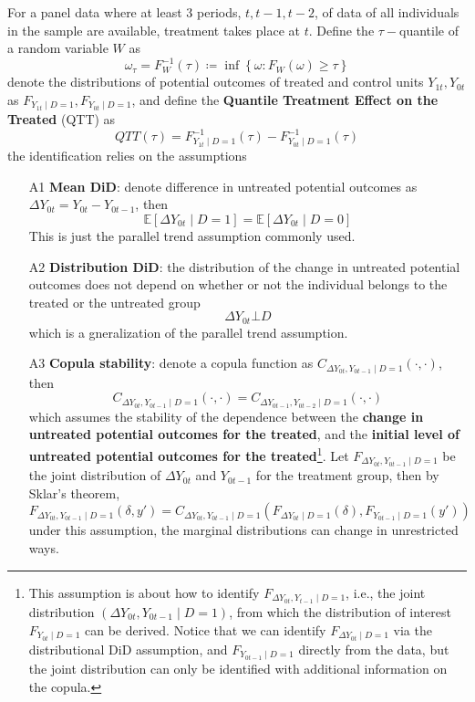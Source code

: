 \documentclass[twoside]{article}
\begin{document}
For a panel data where at least 3 periods, $t,t-1,t-2$, of data of all individuals in the sample are available, treatment takes place at $t$. Define the $\tau-$quantile of a random variable $W$ as 
$$ \omega_{\tau} = F^{-1}_W(\tau) \coloneq \inf \left\{\omega: F_W(\omega)\geq \tau \right\} $$
denote the distributions of potential outcomes of treated and control units $Y_{1t},Y_{0t}$ as $F_{Y_{1t}\mid D=1},F_{Y_{0t}\mid D=1}$, and define the \textbf{Quantile Treatment Effect on the Treated} (QTT) as 
$$ QTT(\tau) = F^{-1}_{Y_{1t}\mid D=1}(\tau) - F^{-1}_{Y_{0t}\mid D=1}(\tau ) $$
the identification relies on the assumptions 
\begin{itemize}
    \item[A1] \textbf{Mean DiD}: denote difference in untreated potential outcomes as $\Delta Y_{0t}=Y_{0t}-Y_{0t-1}$, then $$ \mathbb{E}\left[\Delta Y_{0t}\mid D=1\right] = \mathbb{E}\left[\Delta Y_{0t}\mid D=0\right] $$ This is just the parallel trend assumption commonly used.
    \item[A2] \textbf{Distribution DiD}: the distribution of the change in untreated potential outcomes does not depend on whether or not the individual belongs to the treated or the untreated group $$ \Delta Y_{0t} \bot D $$ which is a gneralization of the parallel trend assumption.
    \item[A3] \textbf{Copula stability}: denote a copula function as $ C_{\Delta Y_{0t},Y_{0t-1}\mid D=1}\left(\cdot,\cdot\right) $, then $$ C_{\Delta Y_{0t},Y_{0t-1}\mid D=1}\left(\cdot,\cdot\right) = C_{\Delta Y_{0t-1},Y_{0t-2}\mid D=1}\left(\cdot,\cdot\right) $$
    which assumes the stability of the dependence between the \textbf{change in untreated potential outcomes for the treated}, and the \textbf{initial level of untreated potential outcomes for the treated}\footnote{This assumption is about how to identify $F_{\Delta Y_{0t},Y_{t-1}\mid D=1}$, i.e., the joint distribution $\left(\Delta Y_{0t},Y_{0t-1}\mid D=1\right)$, from which the distribution of interest $F_{Y_{0t}\mid D=1}$ can be derived. Notice that we can identify $F_{\Delta Y_{0t}\mid D=1}$ via the distributional DiD assumption, and $F_{Y_{0t-1}\mid D=1}$ directly from the data, but the joint distribution can only be identified with additional information on the copula.}.
    Let $F_{\Delta Y_{0t},Y_{0t-1}\mid D=1}$ be the joint distribution of $\Delta Y_{0t}$ and $Y_{0t-1}$ for the treatment group, then by Sklar's theorem,
    \begin{equation*}
        F_{\Delta Y_{0t},Y_{0t-1}\mid D=1} \left(\delta,y'\right) = C_{\Delta Y_{0t},Y_{0t-1}\mid D=1 } \left( F_{\Delta Y_{0t}\mid D=1}(\delta), F_{Y_{0t-1}\mid D=1}(y') \right)
    \end{equation*}
    under this assumption, the marginal distributions can change in unrestricted ways.
\end{itemize}
\end{document}
